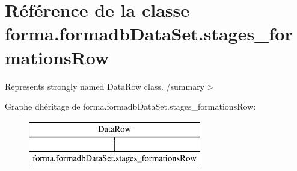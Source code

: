\hypertarget{classforma_1_1formadb_data_set_1_1stages__formations_row}{}\section{Référence de la classe forma.\+formadb\+Data\+Set.\+stages\+\_\+formations\+Row}
\label{classforma_1_1formadb_data_set_1_1stages__formations_row}


Represents strongly named Data\+Row class. /summary$>$  


Graphe d\textquotesingle{}héritage de forma.\+formadb\+Data\+Set.\+stages\+\_\+formations\+Row\+:\begin{figure}[H]
\begin{center}
\leavevmode
\includegraphics[height=2.000000cm]{classforma_1_1formadb_data_set_1_1stages__formations_row}
\end{center}
\end{figure}

